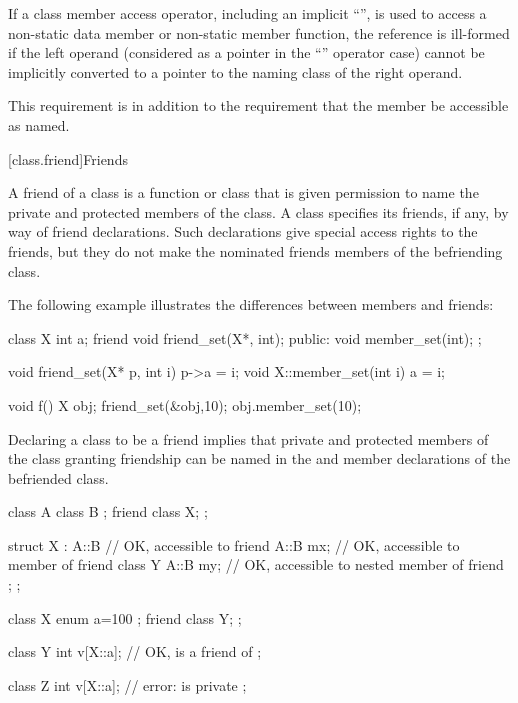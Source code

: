 \pnum
If a class member access operator, including an implicit
``'',
is used to access a non-static data member or non-static
member function, the reference is ill-formed if the
left operand (considered as a pointer in the
``''
operator case) cannot be implicitly converted to a
pointer to the naming class of the right operand.
\begin{note}
This requirement is in addition to the requirement that
the member be accessible as named.
\end{note}

[class.friend]{Friends}%
%

\pnum
A friend of a class is a function or class that is
given permission to name the private and protected members of the class.
A class specifies its friends, if any, by way of friend declarations.
Such declarations give special access rights to the friends, but they
do not make the nominated friends members of the befriending class.
\begin{example}
The following example illustrates the differences between
members and friends:
%

\begin{codeblock}
class X {
  int a;
  friend void friend_set(X*, int);
public:
  void member_set(int);
};

void friend_set(X* p, int i) { p->a = i; }
void X::member_set(int i) { a = i; }

void f() {
  X obj;
  friend_set(&obj,10);
  obj.member_set(10);
}
\end{codeblock}
\end{example}

\pnum
{}%
Declaring a class to be a friend implies that private and
protected members of the class granting friendship can be named in the
 and member declarations of the befriended
class.
\begin{example}
\begin{codeblock}
class A {
  class B { };
  friend class X;
};

struct X : A::B {               // OK,  accessible to friend
  A::B mx;                      // OK,  accessible to member of friend
  class Y {
    A::B my;                    // OK,  accessible to nested member of friend
  };
};
\end{codeblock}
\end{example}
\begin{example}
\begin{codeblock}
class X {
  enum { a=100 };
  friend class Y;
};

class Y {
  int v[X::a];                  // OK,  is a friend of 
};

class Z {
  int v[X::a];                  // error:  is private
};
\end{codeblock}
\end{example}


